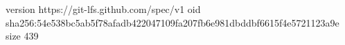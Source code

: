 version https://git-lfs.github.com/spec/v1
oid sha256:54e538bc5ab5f78afadb422047109fa207fb6e981dbddbf6615f4e5721123a9e
size 439

